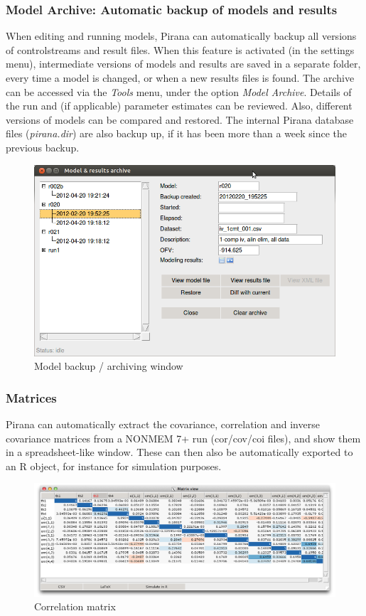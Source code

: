 {{{{\subsubsection*{Model Archive: Automatic backup of models and results}
When editing and running models, Pirana can automatically backup all
versions of controlstreams and result files. When this feature is
activated (in the settings menu), intermediate versions of models and
results are saved in a separate folder, every time a model is changed,
or when a new results files is found. The archive can be accessed via
the \textit{Tools} menu, under the option \textit{Model
  Archive}. Details of the run and (if applicable) parameter estimates
can be reviewed. Also, different versions of models can be compared
and restored. The internal Pirana database files (\textit{pirana.dir})
are also backup up, if it has been more than a week since the previous
backup.

\begin{figure}[H] \centering
    \includegraphics[scale=0.35]{images/modelbackup.png}
    \caption{Model backup / archiving window}
\end{figure}

\subsubsection*{Matrices}
Pirana can automatically extract the covariance, correlation and
inverse covariance matrices from a NONMEM 7+ run (cor/cov/coi files),
and show them in a spreadsheet-like window. These can then also be
automatically exported to an R object, for instance for simulation
purposes.

\begin{figure}[H] \centering
    \includegraphics[scale=0.28]{images/cor.png}
    \caption{Correlation matrix}
\end{figure}

}}}}
